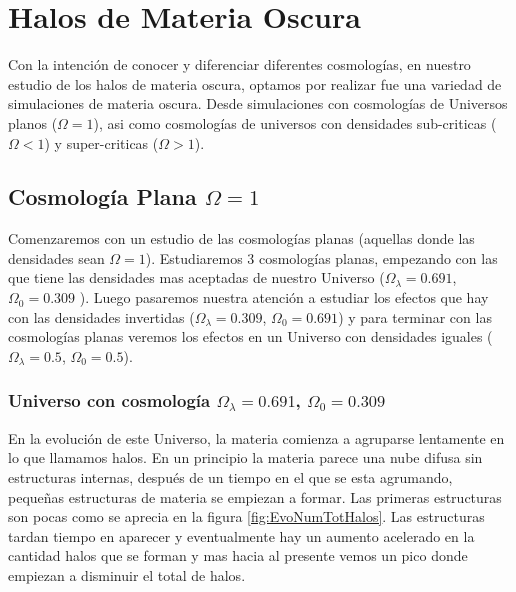 \chapter{Halos de Materia Oscura}
\setcounter{equation}{0}

\noindent Con la intención de conocer y diferenciar diferentes cosmologías, en nuestro estudio de los halos de materia oscura, optamos por realizar fue una variedad de simulaciones de materia oscura. Desde simulaciones con cosmologías de Universos planos ($\Omega = 1$), asi como cosmologías  de universos con densidades sub-criticas ($\Omega < 1$) y super-criticas ($\Omega > 1$).

\section[]{Cosmología Plana \texorpdfstring{$\Omega = 1$}{Omega = 1}}

\noindent Comenzaremos con un estudio de las cosmologías planas (aquellas donde las densidades sean $\Omega = 1$). Estudiaremos 3 cosmologías planas, empezando con las que tiene las densidades mas aceptadas de nuestro Universo ($\Omega_\lambda = 0.691$, $\Omega_0 = 0.309$  \cite{2020A&A...641A...1P}). Luego pasaremos nuestra atención a estudiar los efectos que hay con las densidades invertidas ($\Omega_\lambda = 0.309$, $\Omega_0 = 0.691$) y para terminar con las cosmologías planas veremos los efectos en un Universo con densidades iguales ($\Omega_\lambda = 0.5$, $\Omega_0 = 0.5$).

 \subsection{Universo con cosmología  \texorpdfstring{$\Omega_\lambda = 0.691$, $\Omega_0 = 0.309$ }{Omega lambda = 0.691, Omega 0 = 0.309}  }

 En la evolución de este Universo, la materia comienza a agruparse lentamente en lo que llamamos halos. En un principio la materia parece una nube difusa sin estructuras internas, después de un tiempo en el que se esta agrumando, pequeñas estructuras de materia se empiezan a formar. Las primeras estructuras son pocas como se aprecia en la figura \ref{fig:EvoNumTotHalos}. Las estructuras tardan tiempo en aparecer y eventualmente hay un aumento acelerado en la cantidad halos que se forman y mas hacia al presente vemos un pico donde empiezan a disminuir el total de halos.

